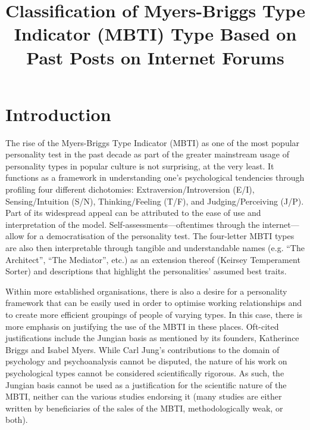 \documentclass[11pt,a4paper]{article}
\title{Classification of Myers-Briggs Type Indicator (MBTI) Type Based on Past Posts on Internet Forums}
\author{}
\begin{document}
	
	\maketitle

	\section{Introduction}
	
	The rise of the Myers-Briggs Type Indicator (MBTI) as one of the most popular personality test in the past decade as part of the greater mainstream usage of personality types in popular culture is not surprising, at the very least. It functions as a framework in understanding one’s psychological tendencies through profiling four different dichotomies: Extraversion/Introversion (E/I), Sensing/Intuition (S/N), Thinking/Feeling (T/F), and Judging/Perceiving (J/P).\autocite{myersGiftsDifferingUnderstanding1995} Part of its widespread appeal can be attributed to the ease of use and interpretation of the model.\autocite{choongPredictingJudgingperceivingMyersBriggs2021} Self-assessments—oftentimes through the internet—allow for a democratisation of the personality test.\autocite{choongPredictingJudgingperceivingMyersBriggs2021} The four-letter MBTI types are also then interpretable through tangible and understandable names (e.g. “The Architect”, “The Mediator”, etc.) as an extension thereof (Keirsey Temperament Sorter) and descriptions that highlight the personalities’ assumed best traits.\autocite{lilienfeldSciencePseudoscienceClinical2014}
	
	Within more established organisations, there is also a desire for a personality framework that can be easily used in order to optimise working relationships and to create more efficient groupings of people of varying types.\autocite{lakeTrustNameBrand2019} In this case, there is more emphasis on justifying the use of the MBTI in these places. Oft-cited justifications include the Jungian basis as mentioned by its founders, Katherince Briggs and Isabel Myers. While Carl Jung’s contributions to the domain of psychology and psychoanalysis cannot be disputed, the nature of his work on psychological types cannot be considered scientifically rigorous.\autocite{carrollMyersBriggsTypeIndicator} As such, the Jungian basis cannot be used as a justification for the scientific nature of the MBTI, neither can the various studies endorsing it (many studies are either written by beneficiaries of the sales of the MBTI, methodologically weak, or both).\autocite{coffieldLearningStylesPedagogy2004}
	
\end{document}
